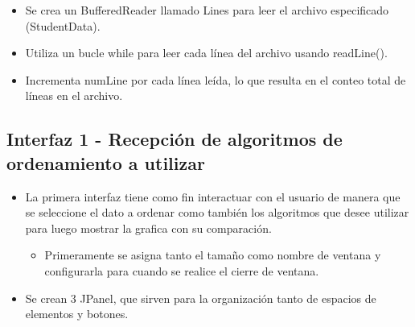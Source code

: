 \documentclass{article}
\begin{document}
	\begin{itemize}	
		\item Se crea un BufferedReader llamado Lines para leer el archivo especificado (StudentData).
		\item Utiliza un bucle while para leer cada línea del archivo usando readLine().
        \item Incrementa numLine por cada línea leída, lo que resulta en el conteo total de líneas en el archivo.
	\end{itemize}


	
    
    


    \subsection{Interfaz 1 - Recepción de algoritmos de ordenamiento a utilizar}
    
    \begin{itemize}
        \item La primera interfaz tiene como fin interactuar con el usuario de manera que se seleccione el dato a ordenar como también los algoritmos que desee utilizar para luego mostrar la grafica con su comparación.
        \begin{itemize}
            \item Primeramente se asigna tanto el tamaño como nombre de ventana y configurarla para cuando se realice el cierre de ventana.
        \end{itemize}
    \end{itemize}
    

    \begin{itemize}
        \begin{itemize}
            \item Se crean 3 JPanel, que sirven para la organización tanto de espacios de elementos y botones.
        \end{itemize}
    \end{itemize}
    
\end{document}
